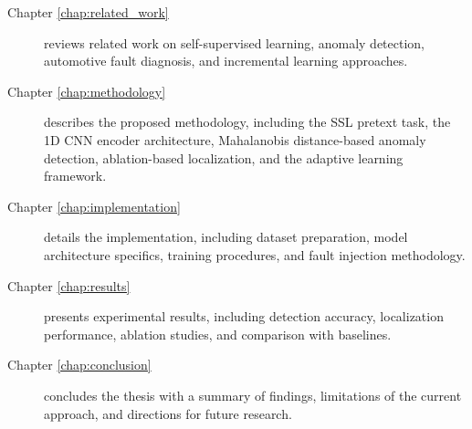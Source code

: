 \begin{description}
    \item[Chapter \ref{chap:related_work}] reviews related work on self-supervised learning, anomaly detection, automotive fault diagnosis, and incremental learning approaches.

    \item[Chapter \ref{chap:methodology}] describes the proposed methodology, including the SSL pretext task, the 1D CNN encoder architecture, Mahalanobis distance-based anomaly detection, ablation-based localization, and the adaptive learning framework.

    \item[Chapter \ref{chap:implementation}] details the implementation, including dataset preparation, model architecture specifics, training procedures, and fault injection methodology.

    \item[Chapter \ref{chap:results}] presents experimental results, including detection accuracy, localization performance, ablation studies, and comparison with baselines.

    \item[Chapter \ref{chap:conclusion}] concludes the thesis with a summary of findings, limitations of the current approach, and directions for future research.
\end{description}
